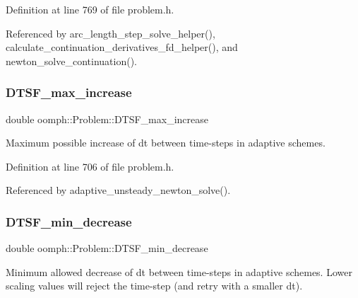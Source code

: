 Definition at line 769 of file problem.\+h.



Referenced by arc\+\_\+length\+\_\+step\+\_\+solve\+\_\+helper(), calculate\+\_\+continuation\+\_\+derivatives\+\_\+fd\+\_\+helper(), and newton\+\_\+solve\+\_\+continuation().

\mbox{\label{classoomph_1_1Problem_aaaeab9469b342a3b849ee5f2ef7051f3}} 
\subsubsection{\texorpdfstring{D\+T\+S\+F\+\_\+max\+\_\+increase}{DTSF\_max\_increase}}
{\footnotesize\ttfamily double oomph\+::\+Problem\+::\+D\+T\+S\+F\+\_\+max\+\_\+increase\hspace{0.3cm}{\ttfamily [protected]}}



Maximum possible increase of dt between time-\/steps in adaptive schemes. 



Definition at line 706 of file problem.\+h.



Referenced by adaptive\+\_\+unsteady\+\_\+newton\+\_\+solve().

\mbox{\label{classoomph_1_1Problem_abbb93979ed99d40eb845ba7296355965}} 
\subsubsection{\texorpdfstring{D\+T\+S\+F\+\_\+min\+\_\+decrease}{DTSF\_min\_decrease}}
{\footnotesize\ttfamily double oomph\+::\+Problem\+::\+D\+T\+S\+F\+\_\+min\+\_\+decrease\hspace{0.3cm}{\ttfamily [protected]}}



Minimum allowed decrease of dt between time-\/steps in adaptive schemes. Lower scaling values will reject the time-\/step (and retry with a smaller dt). 



